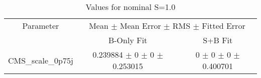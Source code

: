\begin{table}
\centering
\caption{Values for nominal S=1.0}
\begin{tabular}{ccc}
\toprule
Parameter 	& \multicolumn{2}{c}{Mean $\pm$ Mean Error $\pm$ RMS $\pm$ Fitted Error}\\
 	& B-Only Fit & S+B Fit\\
\midrule
CMS\_scale\_0p75j 	& \num{0.239884} $\pm$ \num{0} $\pm$ \num{0} $\pm$ \num{0.253015} 	& \num{0} $\pm$ \num{0} $\pm$ \num{0} $\pm$ \num{0.400701}\\
\bottomrule
\end{tabular}
\end{table}